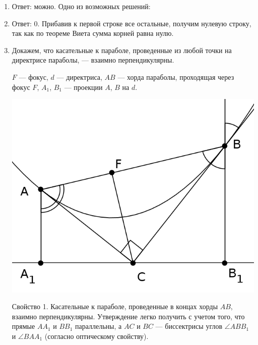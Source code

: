 \begin{enumerate}
\item Ответ: можно. Одно из возможных решений:

\begin{center}
\end{center}

\item Ответ: 0. Прибавив к первой строке все остальные, получим нулевую строку, так как по теореме Виета сумма корней равна нулю.

\item Докажем, что касательные к параболе, проведенные из любой точки на директрисе параболы, --- взаимно перпендикулярны.

$F$ --- фокус, $d$ --- директриса, $AB$ --- хорда параболы, проходящая через фокус $F$, $A_1$, $B_1$ --- проекции $A$, $B$ на $d$. 

\begin{center}
%
\includegraphics{pictures/2013-2014-3}
\end{center}

Свойство 1. Касательные к параболе, проведенные в концах хорды $AB$, взаимно перпендикулярны. Утверждение легко получить с учетом того, что прямые $AA_1$ и $BB_1$ параллельны, а $AC$ и $BC$ --- биссектрисы углов $\angle ABB_1$ и $\angle BAA_1$ (согласно оптическому свойству).


\end{enumerate}

